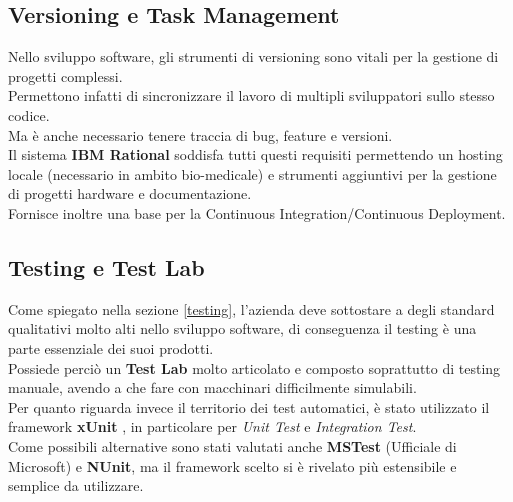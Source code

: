 \documentclass[\main/Tesi.tex]{subfiles}
\begin{document}
\subsection{Versioning e Task Management}
Nello sviluppo software, gli strumenti di versioning sono vitali per la gestione di progetti complessi.\\
Permettono infatti di sincronizzare il lavoro di multipli sviluppatori sullo stesso codice.\\
Ma è anche necessario tenere traccia di bug, feature e versioni.\\
Il sistema \textbf{IBM Rational} \cite{rational} soddisfa tutti questi requisiti permettendo un hosting locale (necessario in ambito bio-medicale) e strumenti aggiuntivi per la gestione di progetti hardware e documentazione.\\
Fornisce inoltre una base per la Continuous Integration/Continuous Deployment. 

\subsection{Testing e Test Lab}
Come spiegato nella sezione \ref{testing}, l'azienda deve sottostare a degli standard qualitativi molto alti nello sviluppo software, di conseguenza il testing è una parte essenziale dei suoi prodotti.\\
Possiede perciò un \textbf{Test Lab} molto articolato e composto soprattutto di testing manuale, avendo a che fare con macchinari difficilmente simulabili.\\
Per quanto riguarda invece il territorio dei test automatici, è stato utilizzato il framework \textbf{xUnit} \cite{xunit}, in particolare per \textit{Unit Test} e \textit{Integration Test}.\\
Come possibili alternative sono stati valutati anche \textbf{MSTest} (Ufficiale di Microsoft) e \textbf{NUnit}, ma il framework scelto si è rivelato più estensibile e semplice da utilizzare.
\end{document}
